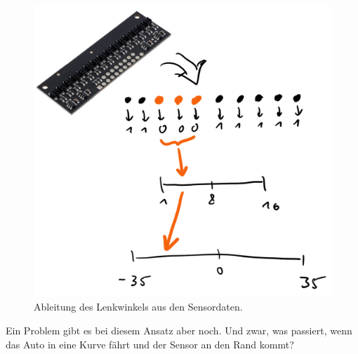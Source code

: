 	\begin{figure}[H]
		\centering
		\label{sensor8}
		\includegraphics[scale=0.5]{img/Sensor/Sensor8.png}
		\caption{Ableitung des Lenkwinkels aus den Sensordaten.}
	\end{figure}
	
	Ein Problem gibt es bei diesem Ansatz aber noch. Und zwar, was passiert, wenn das Auto in eine Kurve fährt und der Sensor an den Rand kommt?
	
